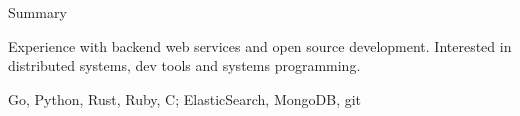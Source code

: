 \documentclass{resume} %
\begin{document}

\begin{rSection}{Summary}
  \begin{rSummarySection}
  {
    \item Experience with backend web services and open source development. Interested in distributed systems, dev tools and systems programming.
    \item Go, Python, Rust, Ruby, C; ElasticSearch, MongoDB, git
  }
  \end{rSummarySection}
\end{rSection}

\end{document}
